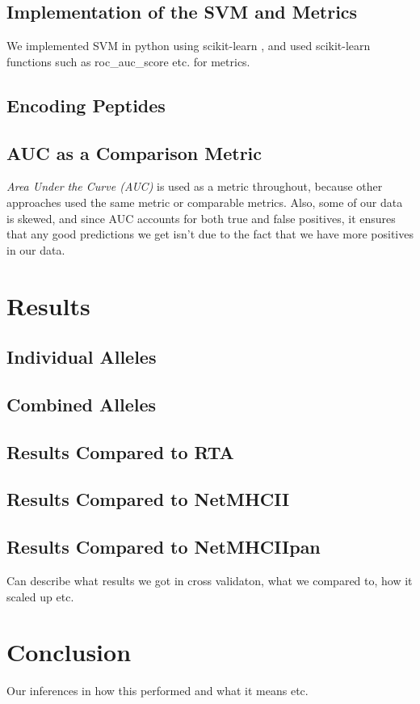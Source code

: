 \documentclass[journal]{IEEEtran}
\begin{document}
\subsection{Implementation of the SVM and Metrics}
We implemented SVM in python using scikit-learn \cite{ScikitLearn}, and used scikit-learn functions such as roc\_auc\_score etc. for metrics.
\subsection{Encoding Peptides}


\subsection{AUC as a Comparison Metric} 
\textit{Area Under the Curve (AUC)} is used as a metric throughout, because other approaches used the same metric or comparable metrics. Also, some of our data is skewed, and since AUC accounts for both true and false positives, it ensures that any good predictions we get isn't due to the fact that we have more positives in our data.


\section{Results}
\subsection{Individual Alleles}
\subsection{Combined Alleles}
\subsection{Results Compared to RTA}
\subsection{Results Compared to NetMHCII}
\subsection{Results Compared to NetMHCIIpan}
Can describe what results we got in cross validaton, what we compared to, how it scaled up etc.


\section{Conclusion}
Our inferences in how this performed and what it means etc.
\end{document}
